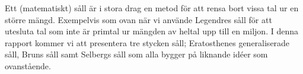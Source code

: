 Ett (matematiskt) såll är i stora drag en metod för att rensa bort vissa tal ur en större mängd.
Exempelvis som ovan när vi använde Legendres såll för att utesluta tal som inte är primtal ur mängden av heltal upp till en miljon.
I denna rapport kommer vi att presentera tre stycken såll; Eratosthenes generaliserade såll, Bruns såll samt Selbergs såll som alla bygger på liknande idéer som ovanstående.

